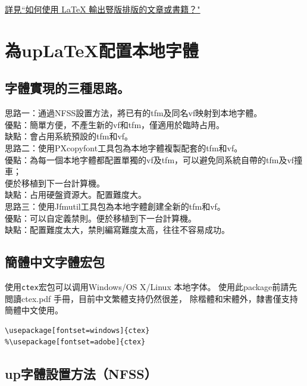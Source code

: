 \par\href{https://www.zhihu.com/question/20544732/answer/15437234}%
{詳見``如何使用 LaTeX 輸出豎版排版的文章或書籍？"}



\section{為up{\LaTeX}配置本地字體}

\subsection{字體實現的三種思路。}
\par\noindent
思路一：通過NFSS設置方法，將已有的tfm及同名vf映射到本地字體。\\
優點：簡單方便，不產生新的vf和tfm，僅適用於臨時占用。\\
缺點：會占用系統預設的tfm和vf。\\[5mm]
思路二：使用PXcopyfont工具包為本地字體複製配套的tfm和vf。\\
優點：為每一個本地字體都配置單獨的vf及tfm，可以避免同系統自帶的tfm及vf撞車；\\
\hspace{3zw}便於移植到下一台計算機。\\
缺點：占用硬盤資源大。配置難度大。\\[5mm]
思路三：使用Jfmutil工具包為本地字體創建全新的tfm和vf。\\
優點：可以自定義禁則。便於移植到下一台計算機。\\
缺點：配置難度太大，禁則編寫難度太高，往往不容易成功。


\subsection{簡體中文字體宏包}
\par
使用\verb+ctex+宏包可以调用Windows/OS X/Linux 本地字体。
使用此package前請先閲讀ctex.pdf 手冊，目前中文繁體支持仍然很差，
除楷體和宋體外，隸書僅支持簡體中文使用。
\begin{lstlisting}[firstnumber=1]
\usepackage[fontset=windows]{ctex}
%\usepackage[fontset=adobe]{ctex}
\end{lstlisting}


\subsection{{up\LaTeXe}字體設置方法（NFSS）}

